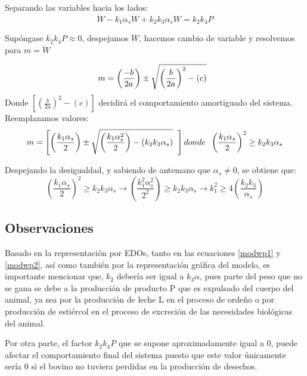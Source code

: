 Separando las variables hacia los lados:
\begin{equation}
    \ddot{W}- k_{1}\alpha_{s}\dot{W} + k_{2}k_{3}\alpha_{s}W = k_{2}k_{4}P
\end{equation}

Supóngase  $k_{2}k_{4}P\approx 0$, despejamos $\ddot{W}$, hacemos cambio de variable y resolvemos para $m = \ddot{W}$

\begin{equation}
    m=\left(\frac{-b}{2a}\right) \pm \sqrt{\left(\frac{b}{2a}\right)^{2}-(c)} \hspace{0.2cm}
\end{equation}
Donde $\left[\left(\frac{b}{2a}\right)^{2} - (c)\right]$ decidirá el comportamiento amortiguado del sistema. Reemplazamos valores:
\begin{equation}
    m=\left[\left(\frac{k_{1}\alpha_{s}}{2}\right)\pm\sqrt{\left(\frac{k_{1}\alpha_{s}^{2}}{2}\right)-(k_{2}k_{3}\alpha_{s})} \hspace{0.2cm}\right] donde \hspace{0.2cm} \left(\frac{k_{1}\alpha_{s}}{2}\right)^{2}\geq k_{2}k_{3}\alpha_{s}
\end{equation}

Despejando la desigualdad, y sabiendo de antemano que
 $\alpha_{s}\neq 0$, se obtiene que:
\begin{equation} \label{relacionkis}
    \left(\frac{k_{1}\alpha_{s}}{2}\right)^{2}\geq k_{2}k_{3}\alpha_{s} \longrightarrow \left(\frac{k_{1}^{2}\alpha_{s}^{2}}{2^{2}}\right)\geq k_{2}k_{3}\alpha_{s} \longrightarrow k_{1}^{2}\geq 4\left(\frac{k_{2}k_{3}}{\alpha_{s}}\right)
\end{equation}
\subsection{Observaciones}
Basado en la representación por EDOs, tanto en las ecuaciones \ref{modwp1} y \ref{modwp2}, así como también por la representación gráfica del modelo, es importante mencionar que, $k_{2}$ debería ser igual a $k_{3}\alpha$, pues parte del peso que no se gana se debe a la producción de producto P que es expulsado del cuerpo del animal, ya sea por la producción de leche L en el proceso de ordeño o por producción de estiércol en el proceso de excreción de las necesidades biológicas del animal.

Por otra parte, el factor $k_{2}k_{4}P$ que se supone aproximadamente igual a 0, puede afectar el comportamiento final del sistema puesto que este valor únicamente sería 0 si el bovino no tuviera perdidas en la producción de desechos.
